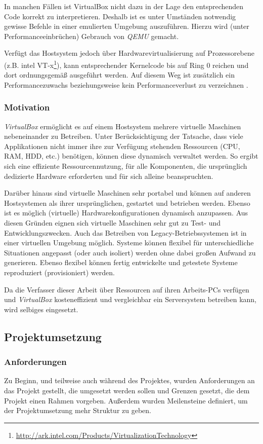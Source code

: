 In manchen Fällen ist VirtualBox nicht dazu in der Lage den entsprechenden Code korrekt zu
interpretieren. Deshalb ist es unter Umständen notwendig gewisse Befehle in einer
emulierten Umgebung auszuführen. Hierzu wird (unter Performanceeinbrüchen) Gebrauch von
\textit{QEMU} gemacht. 

Verfügt das Hostsystem jedoch über Hardwarevirtualisierung auf Prozessorebene 
(z.B. intel VT-x\footnote{\url{http://ark.intel.com/Products/VirtualizationTechnology}}),
kann entsprechender Kernelcode bis auf Ring 0 reichen und dort ordnungsgemäß ausgeführt werden.
Auf diesem Weg ist zusätzlich
ein Performancezuwachs beziehungsweise kein Performanceverlust zu verzeichnen \cite{victor10}.

\subsubsection{Motivation}
\textit{VirtualBox} ermöglicht es auf einem Hostsystem mehrere virtuelle Maschinen nebeneinander
zu Betreiben. Unter Berücksichtigung der Tatsache, dass viele Applikationen nicht immer ihre
zur Verfügung stehenden Ressourcen (CPU, RAM, HDD, etc.) benötigen, können diese dynamisch verwaltet
werden. So ergibt sich eine effiziente Ressourcennutzung, für alle Komponenten, die ursprünglich
dedizierte Hardware erforderten und für sich alleine beanspruchten.

Darüber hinaus sind virtuelle Maschinen sehr portabel und können auf anderen Hostsystemen als
ihrer ursprünglichen, gestartet und betrieben werden. Ebenso ist es möglich (virtuelle)
Hardwarekonfigurationen dynamisch anzupassen. Aus diesen Gründen eignen sich virtuelle
Maschinen sehr gut zu Test- und Entwicklungszwecken. Auch das Betreiben von Legacy-Betriebssystemen
ist in einer virtuellen Umgebung möglich. Systeme können flexibel für unterschiedliche
Situationen angepasst (oder auch isoliert) werden ohne dabei großen Aufwand zu generieren.
Ebenso flexibel können fertig entwickelte und getestete Systeme reproduziert (provisioniert) werden.

Da die Verfasser dieser Arbeit über Ressourcen auf ihren Arbeits-PCs verfügen und \textit{VirtualBox}
kosteneffizient und vergleichbar ein Serversystem betreiben kann, wird selbiges eingesetzt.

\subsection{Projektumsetzung}
 \subsubsection{Anforderungen}
 Zu Beginn, und teilweise auch während des Projektes, wurden Anforderungen
 an das Projekt gestellt, die umgesetzt werden sollen und Grenzen gesetzt, die
 dem Projekt einen Rahmen vorgeben. Außerdem wurden Meilensteine definiert,
 um der Projektumsetzung mehr Struktur zu geben.
 
